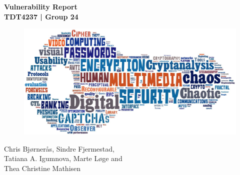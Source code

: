 \begin{titlepage}
\begin{center}

{\Huge \bf Vulnerability Report} \\[1.0cm]
{\Large \bf TDT4237 | Group 24} \\[4.0cm]



\begin{figure}[ht!]
\centering
\advance\leftskip-2cm
\includegraphics[scale=1.0]{pics/Word_Cloud_Research.png}
\end{figure}

\vspace{3.5cm}

{Chris Bjørnerås, Sindre Fjermestad, \\
Tatiana A. Igumnova, Marte Løge and \\
Thea Christine Mathisen}


\end{center}
\end{titlepage}